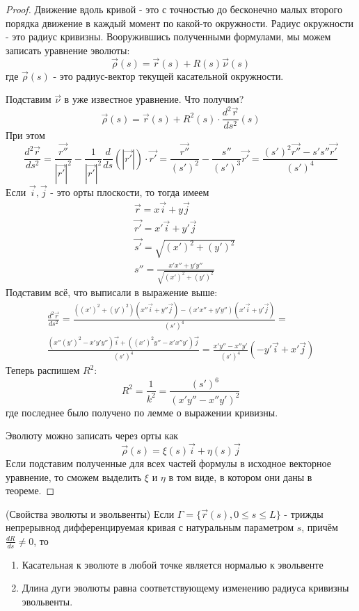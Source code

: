 \begin{proof}
	Движение вдоль кривой - это с точностью до бесконечно малых второго порядка движение в каждый момент по какой-то окружности. Радиус окружности - это радиус кривизны. Вооружившись полученными формулами, мы можем записать уравнение эволюты:
	\[
	\vec{\rho}(s) = \vec{r}(s) + R(s) \vec{\nu}(s)
	\]
	где $\vec{\rho}(s)$ - это радиус-вектор текущей касательной окружности.
	
	Подставим $\vec{\nu}$ в уже известное уравнение. Что получим?
	\[
		\vec{\rho}(s) = \vec{r}(s) + R^2(s) \cdot \frac{d^2\vec{r}}{ds^2}(s)
	\]
	При этом
	\[
		\frac{d^2\vec{r}}{ds^2} = \frac{\vec{r''}}{|\vec{r'}|^2} - \frac{1}{|\vec{r'}|^2} \frac{d}{ds}(|\vec{r'}|) \cdot \vec{r'} = \frac{\vec{r''}}{(s')^2} - \frac{s''}{(s')^3}\vec{r'} = \frac{(s')^2 \vec{r''} - s's''\vec{r'}}{(s')^4}
	\]
	Если $\vec{i}, \vec{j}$ - это орты плоскости, то тогда имеем
	\begin{align*}
		&{\vec{r} = x\vec{i} + y\vec{j}}
		\\
		&{\vec{r'} = x'\vec{i} + y'\vec{j}}
		\\
		&{\vec{s'} = \sqrt{(x')^2 + (y')^2}}
		\\
		&{s'' = \frac{x'x'' + y'y''}{\sqrt{(x')^2 + (y')^2}}}
	\end{align*}
	Подставим всё, что выписали в выражение выше:
	\begin{multline*}
		\frac{d^2\vec{r}}{ds^2} = \frac{\left((x')^2 + (y')^2\right)(x''\vec{i} + y''\vec{j}) - (x'x'' + y'y'')(x'\vec{i} + y'\vec{j})}{(s')^4} =
		\\
		\frac{(x''(y')^2 - x'y'y'')\vec{i} + ((x')^2y'' - x'x''y')\vec{j}}{(s')^4} = \frac{x'y'' - x''y'}{(s')^4}(-y'\vec{i} + x'\vec{j})
	\end{multline*}
	Теперь распишем $R^2$:
	\[
		R^2 = \frac{1}{k^2} = \frac{(s')^6}{(x'y'' - x''y')^2}
	\]
	где последнее было получено по лемме о выражении кривизны.
	
	Эволюту можно записать через орты как
	\[
		\vec{\rho}(s) = \xi(s)\vec{i} + \eta(s)\vec{j}
	\]
	Если подставим полученные для всех частей формулы в исходное векторное уравнение, то сможем выделить $\xi$ и $\eta$ в том виде, в котором они даны в теореме.
\end{proof}

\begin{theorem} (Свойства эволюты и эвольвенты)
	Если $\Gamma = \{\vec{r}(s), 0 \le s \le L\}$ - трижды непрерывнод дифференцируемая кривая с натуральным параметром $s$, причём $\frac{dR}{ds} \neq 0$, то
	\begin{enumerate}
		\item Касательная к эволюте в любой точке является нормалью к эвольвенте
		
		\item Длина дуги эволюты равна соответствующему изменению радиуса кривизны эвольвенты.
	\end{enumerate}
\end{theorem}

